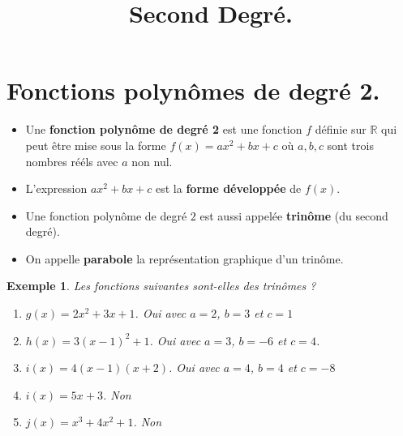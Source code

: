 \documentclass[a4paper,11pt]{article}
\title{Second Degré.}
\author{}
\date{}
\theoremstyle{break}
\newcounter{enonce}
\newtheorem{exemple}[enonce]{Exemple}
\begin{document}
 
  \maketitle


  
  \section{Fonctions polynômes de degré 2.}
  
  
  \begin{definition}
    \begin{itemize}
     \item Une \textbf{fonction polynôme de degré 2} est une fonction $f$ définie sur $\mathbb{R}$
    qui peut être mise sous la forme $f(x)=ax^2+bx+c$ où $a,b,c$ sont trois nombres 
    rééls avec $a$ non nul.
     
     \item L'expression $ax^2+bx+c$ est la \textbf{forme développée} de $f(x)$.
     \item Une fonction polynôme de degré $2$ est aussi appelée 
     \textbf{trinôme} (du second degré).
     \item On appelle \textbf{parabole} la représentation graphique 
     d'un trinôme.
   \end{itemize}    
  \end{definition}
  
  
  
  \begin{exemple}
    Les fonctions suivantes sont-elles des trinômes ?
    \begin{enumerate}
     \item $g(x)=2x^2+3x+1$. Oui avec $a=2$, $b=3$ et $c=1$
     \item $h(x)=3(x-1)^2+1$. Oui avec $a=3$, $b=-6$ et $c=4$.
     \item $i(x)=4(x-1)(x+2)$. Oui avec $a=4$, $b=4$ et $c=-8$
     \item $i(x)=5x+3$. Non
     \item $j(x)=x^3+4x^2+1$. Non
     \end{enumerate}
 
 \end{exemple}
  
\end{document}
